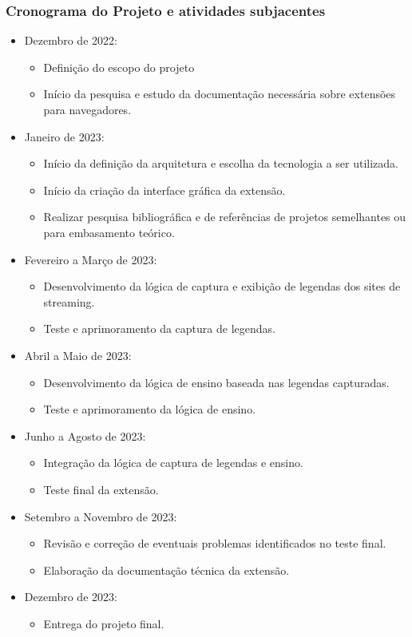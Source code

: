 \documentclass[12pt]{article}
\begin{document}
\subsubsection{Cronograma do Projeto e atividades subjacentes}
\begin{itemize}

\item Dezembro de 2022:
\begin{itemize}
\item Definição do escopo do projeto
\item Início da pesquisa e estudo da documentação necessária sobre extensões para navegadores.
\end{itemize}

\item Janeiro de 2023:
\begin{itemize}
\item Início da definição da arquitetura e escolha da tecnologia a ser utilizada.
\item Início da criação da interface gráfica da extensão.
\item Realizar pesquisa bibliográfica e de referências de projetos semelhantes ou para embasamento teórico.
\end{itemize}

\item Fevereiro a Março de 2023:
\begin{itemize}
\item Desenvolvimento da lógica de captura e exibição de legendas dos sites de streaming.
\item Teste e aprimoramento da captura de legendas.
\end{itemize}

\item Abril a Maio de 2023:
\begin{itemize}
\item Desenvolvimento da lógica de ensino baseada nas legendas capturadas.
\item Teste e aprimoramento da lógica de ensino.
\end{itemize}


\item Junho a Agosto de 2023:
\begin{itemize}
\item Integração da lógica de captura de legendas e ensino.
\item Teste final da extensão.
\end{itemize}

\item Setembro a Novembro de 2023:
\begin{itemize}
\item Revisão e correção de eventuais problemas identificados no teste final.
\item Elaboração da documentação técnica da extensão.
\end{itemize}

\item Dezembro de 2023:
\begin{itemize}
\item Entrega do projeto final.
\end{itemize}

\end{itemize}




\end{document}
